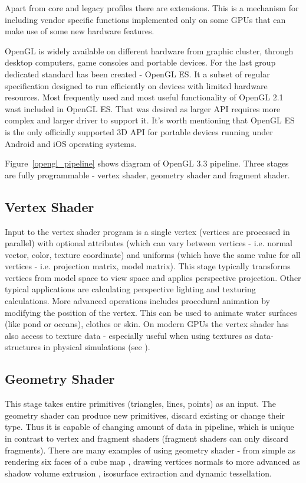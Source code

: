 Apart from core and legacy profiles there are extensions. This is a mechanism for including vendor specific functions implemented only on some GPUs that can make use of some new hardware features. 

OpenGL is widely available on different hardware from graphic cluster, through desktop computers, game consoles and portable devices. For the last group dedicated standard has been created - OpenGL ES. It a subset of regular specification designed to run efficiently on devices with limited hardware resources. Most frequently used and most useful functionality of OpenGL 2.1 wast included in OpenGL ES. That was desired as larger API requires more complex and larger driver to support it. It's worth mentioning that OpenGL ES is the only officially supported 3D API for portable devices running under Android and iOS operating systems. 


Figure~\ref{opengl_pipeline} shows diagram of OpenGL 3.3 pipeline. Three stages are fully programmable - vertex shader, geometry shader and fragment shader. 

\subsection{Vertex Shader}
Input to the vertex shader program is a single vertex (vertices are processed in parallel) with optional attributes (which can vary between vertices - i.e.  normal vector, color, texture coordinate) and uniforms (which have the same value for all vertices - i.e. projection matrix, model matrix). This stage typically transforms vertices from model space to view space and applies perspective projection. Other typical applications are calculating perspective lighting and texturing calculations. More advanced operations includes procedural animation by modifying the position of the vertex. This can be used to animate water surfaces (like pond or oceans), clothes or skin. On modern GPUs the vertex shader has also access to texture data - especially useful when using textures as data-structures in physical simulations (see \cite[pages~412-419]{OpenGLSuperbible}).

\subsection{Geometry Shader}
This stage takes entire primitives (triangles, lines, points) as an input. The geometry shader can produce new primitives, discard existing or change their type. Thus it is capable of changing amount of data in pipeline, which is unique in contrast to vertex and fragment shaders (fragment shaders can only discard fragments). There are many examples of using geometry shader - from simple as rendering six faces of a cube map \cite{Gregory2009}, drawing vertices normals \cite[pages~434-437]{OpenGLSuperbible} to more advanced as shadow volume extrusion \cite[section~10.3.3.1]{Gregory2009}, isosurface extraction \cite{3DCourseSIGGraph2007} and dynamic tessellation. 

